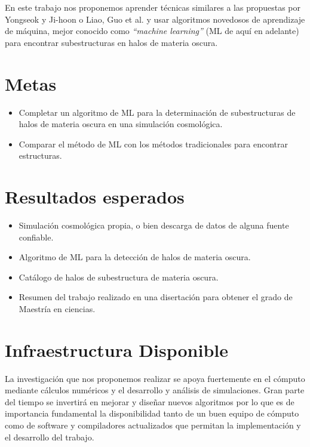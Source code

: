 \documentclass[12pt,spanish]{article}
\begin{document}
En este trabajo nos proponemos aprender técnicas similares a las
propuestas por Yongseok y Ji-hoon \cite{mssm} o Liao, Guo et
al. \cite{hiker} y usar algoritmos novedosos de aprendizaje de
máquina, mejor conocido 
como {\it ``machine learning''} (ML de aquí en adelante) para
encontrar subestructuras en halos de materia oscura.

\section*{Metas}

\begin{itemize}
\item Completar un algoritmo de ML para la determinación de
  subestructuras de halos de materia oscura en una simulación
  cosmológica. 
\item Comparar el método de ML con los métodos tradicionales para
  encontrar estructuras.
\end{itemize}

\section*{Resultados esperados}

\begin{itemize}
\item Simulación cosmológica propia, o bien descarga de datos de
  alguna fuente confiable.
\item Algoritmo de ML para la detección de halos de materia oscura.
\item Catálogo de halos de subestructura de materia oscura.
\item Resumen del trabajo realizado en una disertación para obtener el
  grado de Maestría en ciencias. 
\end{itemize}

\section*{Infraestructura Disponible}

La investigación que nos proponemos realizar se apoya fuertemente
en el cómputo mediante cálculos numéricos y el desarrollo y
análisis de simulaciones. Gran parte del tiempo se invertirá en
mejorar y diseñar nuevos algoritmos por lo que es de importancia
fundamental la disponibilidad tanto de un buen equipo de cómputo
como de software y compiladores actualizados que
permitan la implementación y el desarrollo del trabajo.
\end{document}
